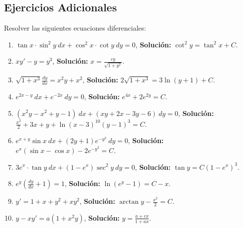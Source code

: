 \subsection{Ejercicios Adicionales}

Resolver las siguientes ecuaciones diferenciales:

\begin{enumerate}
    \item \( \tan x\cdot \sin^{2} y\ dx+\cos^{2} x\cdot \cot y\ dy=0 \), \textbf{Solución:} \( \cot^{2} y=\tan^{2} x+C \).

    \item \( xy'-y=y^{3} \), \textbf{Solución:} \( x=\frac{cy}{\sqrt{1+y^{2}}} \).

    \item \( \sqrt{1+x^{3}}\frac{dy}{dx} =x^{2} y+x^{2} \), \textbf{Solución:} \( 2\sqrt{1+x^{3}} =3\ln (y+1)+C \).

    \item \( e^{2x-y} \ dx+e^{-2x} \ dy=0 \), \textbf{Solución:} \( e^{4x} +2e^{2y} =C \).

    \item \( (x^{2} y-x^{2} +y-1)\ dx+(xy+2x-3y-6)\ dy=0 \), \textbf{Solución:} \( \frac{x^{2}}{2} +3x+y+\ln (x-3)^{10} (y-1)^{3} =C \).

    \item \( e^{x+y}\sin x\ dx+(2y+1)e^{-y^{2}} \ dy=0 \), \textbf{Solución:} \( e^{x} (\sin x-\cos x)-2e^{-y^{2}} =C \).

    \item \( 3e^{x} \cdot \tan y\ dx+(1-e^{x} )\sec^{2} y\ dy=0 \), \textbf{Solución:} \( \tan y=C(1-e^{x} )^{3} \).

    \item \( e^{y}\left(\frac{dy}{dx} +1\right) =1 \), \textbf{Solución:} \( \ln (e^{y} -1)=C-x \).

    \item \( y'=1+x+y^{2} +xy^{2} \), \textbf{Solución:} \( \arctan y-\frac{x^{2}}{2} =C \).

    \item \( y-xy'=a(1+x^{2} y) \), \textbf{Solución:} \( y=\frac{a+cx}{1+ax} \).

\end{enumerate}


